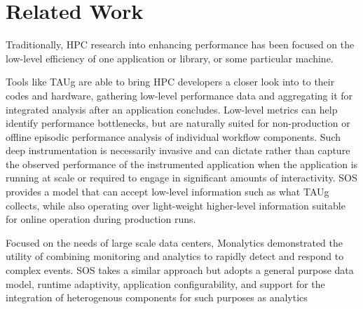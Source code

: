 
\section{Related Work}
%
Traditionally, HPC research into enhancing performance has been
focused on the low-level efficiency of one application or library, or
some particular machine.
%
%
\par
%
Tools like TAUg \cite{huck2006taug} are able to bring HPC developers a closer look into to
their codes and hardware, gathering low-level performance data and
aggregating it for integrated analysis after an application concludes.
%
Low-level metrics can help identify performance bottlenecks, but are
naturally suited for non-production or offline episodic performance
analysis of individual workflow components.
%
Such deep instrumentation is necessarily invasive and can dictate
rather than capture the observed performance of the instrumented
application when the application is running at scale or required to
engage in significant amounts of interactivity.
%
SOS provides a model that can accept low-level information such as
what TAUg collects, while also operating over light-weight higher-level
information suitable for online operation during production runs.
%
\par
%
%
\par
%
Focused on the needs of large scale data centers, Monalytics
\cite{kutare2010monalytics} demonstrated the utility of
combining monitoring and analytics to rapidly detect and respond to
complex events.
%
SOS takes a similar approach but adopts a general purpose data model,
runtime adaptivity, application configurability, and support for the
integration of heterogenous components for such purposes as analytics
